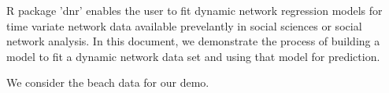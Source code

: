 \documentclass[12pt]{article}
\begin{document}
\newcommand\myeq{\mathrel{\stackrel{\makebox[0pt]{\mbox{\normalfont\tiny def}}}{=}}}

\maketitle

R package 'dnr' enables the user to fit dynamic network regression models for time variate network data available prevelantly in social sciences or social network analysis. In this document, we demonstrate the process of building a model to fit a dynamic network data set and using that model for prediction.

We consider the beach data for our demo.
\end{document}
